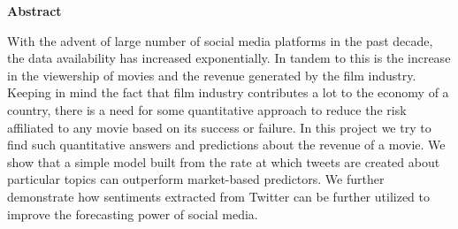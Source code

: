 \begin{center}
{\Large{\bf{Abstract}}}
\end{center}
With the advent of large number of social media platforms in the past decade, the data availability has increased exponentially. In tandem to this is the increase in the viewership of movies and the revenue generated by the film industry. Keeping in mind the fact that film industry contributes a lot to the economy of a country, there is a need for some quantitative approach to reduce the risk affiliated to any movie based on its success or failure. In this project we try to find such quantitative answers and predictions about the revenue of a movie.
We show that a simple model built from the rate at which tweets are created about particular topics can outperform market-based predictors. We further demonstrate how sentiments extracted from Twitter can be further utilized to improve the forecasting power of social media.
\clearpage

